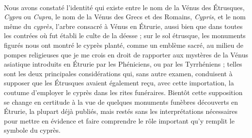 \documentclass{article}
\begin{document}
\paragraph{}
Nous avons constaté l'identité qui existe entre le nom de la Vénus des Étrusques, \emph{Cypra} ou \emph{Cupra}, le nom de la Vénus des Grecs et des Romains, \emph{Cypris}, et le nom même du \emph{cyprès}, l'arbre consacré à Vénus en Étrurie, aussi bien que dans toutes les contrées où fut établi le culte de la déesse ; sur le sol étrusque, les monuments figurés nous ont montré le cyprès planté, comme un emblème sacré, au milieu de pompes religieuses que je me crois en droit de rapporter aux mystères de la Vénus asiatique introduits en Étrurie par les Phéniciens, ou par les Tyrrhéniens ; telles sont les deux principales considérations qui, sans autre examen, conduisent à supposer que les Étrusques avaient également reçu, avec cette importation, la coutume d'employer le cyprès dans les rites funéraires. Bientôt cette supposition se change en certitude à la vue de quelques monuments funèbres découverts en Étrurie, la plupart déjà publiés, mais restés sans les interprétations nécessaires pour mettre en évidence et faire comprendre le rôle important qu'y remplit le symbole du cyprès.
\end{document}
